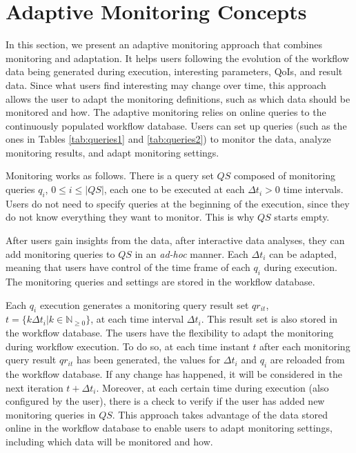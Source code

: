 \section{Adaptive Monitoring Concepts}
\label{sec_adaptive_monitoring_concepts}

In this section, we present an adaptive monitoring approach that
combines monitoring and adaptation. 
It helps users following the
evolution of the workflow data being generated during execution, interesting parameters, QoIs, and result data. Since what
users find interesting may change over time, this approach allows the
user to adapt the monitoring definitions, such as which data should be
monitored and how.
The adaptive monitoring relies on online queries to
the continuously populated workflow database. Users can set up
queries (such as the ones in Tables \ref{tab:queries1} and \ref{tab:queries2}) to monitor the data, analyze monitoring results, and
adapt monitoring settings.

Monitoring works as follows. There is a query set $QS$ composed of
monitoring queries $q_i$, 
$0 \leq i \leq |QS|$,
each one to be
executed at each $\Delta t_i > 0$ time intervals. Users do not need to
specify queries at the beginning of the execution, since they do not know
everything they want to monitor. This is why $QS$ starts empty.

After users gain insights from the data, after interactive 
data analyses, they can add monitoring queries to $QS$ in an
\textit{ad-hoc} manner. 
Each $\Delta t_i$ can be adapted, meaning that users
have control of the time frame of each $q_i$ during
execution. The monitoring queries and settings are stored in the
workflow database.

Each $q_i$ execution generates a monitoring query result set $qr_{it}$, $t = \{k\Delta t_i | k \in \mathbb{N}_{\geq 0}\}$, at each
time interval $\Delta t_i$. This result set is also stored in the
workflow database.
The users have the flexibility to adapt the monitoring during
workflow execution. To do so, at each time instant $t$ after each
monitoring query result $qr_{it}$ has been generated,
the values for $\Delta t_i$ and $q_i$ are reloaded from the
workflow database. If any change has happened, it will be considered in the
next iteration $t + \Delta t_i$.
Moreover, at each certain time during
execution (also configured by the user), there is a check to verify if the user
has added new monitoring queries in $QS$. This approach takes 
advantage of the data stored online in the workflow database to enable users
to adapt monitoring settings, including which data will be monitored and
how.

